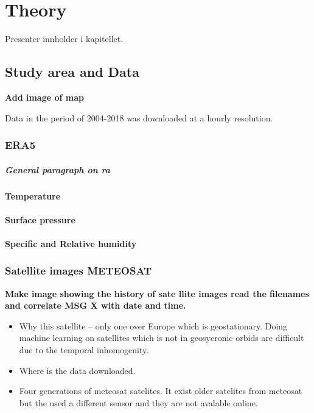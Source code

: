 \setcounter{chapter}{1} 

\chapter{Theory}
Presenter innholder i kapitellet.

\section{Study area and Data}

\textbf{Add image of map}

Data in the period of 2004-2018 was downloaded at a hourly resolution.

\subsection{ERA5}
\paragraph{General paragraph on \acrlong{ra}}

\subsubsection{Temperature}
\subsubsection{Surface pressure}
\subsubsection{Specific and Relative humidity}


\subsection{Satellite images METEOSAT }
\textbf{Make image showing the history of sate
llite images read the filenames and correlate MSG X with date and time.}

\begin{itemize}
    
    \item Why this satellite --  only one over Europe which is geostationary. Doing machine learning on satellites which is not in geosycronic orbids are difficult due to the temporal inhomogenity. 
    
    \item Where is the data downloaded. 
    \item Four generations of meteosat satelites. It exist older satelites from meteosat but the used a different sensor and they are not avalable online. 
    
\end{itemize}

